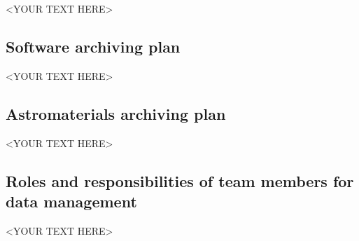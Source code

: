 <YOUR TEXT HERE>


\subsection{Software archiving plan}

<YOUR TEXT HERE>


\subsection{Astromaterials archiving plan}

<YOUR TEXT HERE>


\subsection{Roles and responsibilities of team members for data management}

<YOUR TEXT HERE>